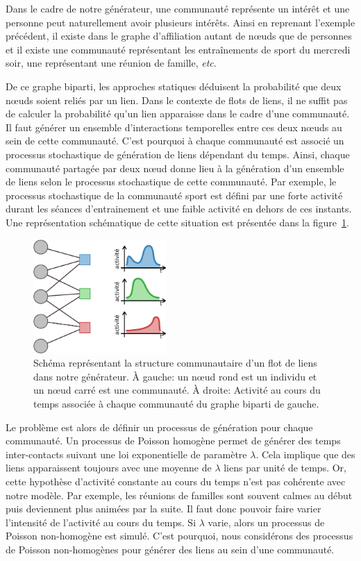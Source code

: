 Dans le cadre de notre générateur, une communauté représente un intérêt et une personne peut naturellement avoir plusieurs intérêts.
Ainsi en reprenant l'exemple précédent, il existe dans le graphe d'affiliation autant de n\oe uds que de personnes et il existe une communauté représentant les entraînements de sport du mercredi soir, une représentant une réunion de famille, \emph{etc}.

De ce graphe biparti, les approches statiques déduisent la probabilité que deux n\oe uds soient reliés par un lien.
Dans le contexte de flots de liens, il ne suffit pas de calculer la probabilité qu'un lien apparaisse dans le cadre d'une communauté.
Il faut générer un ensemble d'interactions temporelles entre ces deux n\oe uds au sein de cette communauté.
C'est pourquoi à chaque communauté est associé un processus stochastique de génération de liens dépendant du temps.
Ainsi, chaque communauté partagée par deux n\oe ud donne lieu à la génération d'un ensemble de liens selon le processus stochastique de cette communauté.
Par exemple, le processus stochastique de la communauté sport est défini par une forte activité durant les séances d'entrainement et une faible activité en dehors de ces instants.
Une représentation schématique de cette situation est présentée dans la figure~\ref{fig:qualite_Generator}.



\begin{figure}
\centering
\includegraphics[width=0.45\textwidth]{img/Qualite/Generator}
\caption{Schéma représentant la structure communautaire d'un flot de liens dans notre générateur.
\`A gauche: un n\oe ud rond est un individu et un n\oe ud carré est une communauté.
\`A droite: Activité au cours du temps associée à chaque communauté du graphe biparti de gauche.}
\label{fig:qualite_Generator}
\end{figure}

Le problème est alors de définir un processus de génération pour chaque communauté.
Un processus de Poisson homogène permet de générer des temps inter-contacts suivant une loi exponentielle de paramètre $\lambda$.
Cela implique que des liens apparaissent toujours avec une moyenne de $\lambda$ liens par unité de temps.
Or, cette hypothèse d'activité constante au cours du temps n'est pas cohérente avec notre modèle.
Par exemple, les réunions de familles sont souvent calmes au début puis deviennent plus animées par la suite.
Il faut donc pouvoir faire varier l'intensité de l'activité au cours du temps.
Si $\lambda$ varie, alors un processus de Poisson non-homogène est simulé.
C'est pourquoi, nous considérons des processus de Poisson non-homogènes pour générer des liens au sein d'une communauté.

